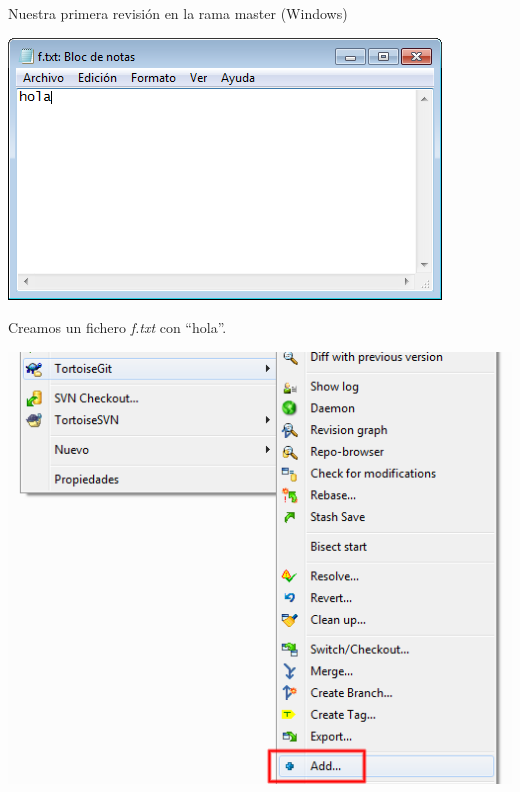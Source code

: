 \documentclass[xcolor=svgnames]{beamer}
\newcommand*{\fichero}[1]{\textit{#1}}
\begin{document}
\begin{frame}[t]{Nuestra primera revisión en la rama master (Windows)}

  \begin{overprint}
    \begin{center}
      \includegraphics[width=\textwidth,height=.6\textheight,keepaspectratio]{tomas/primercommit-06-newfile}

      \vfill

      Creamos un fichero \fichero{f.txt} con ``hola''.
    \end{center}

    \begin{center}
      \includegraphics[width=\textwidth,height=.6\textheight,keepaspectratio]{tomas/primercommit-00-add}


\end{center}
\end{overprint}
\end{frame}
\end{document}
